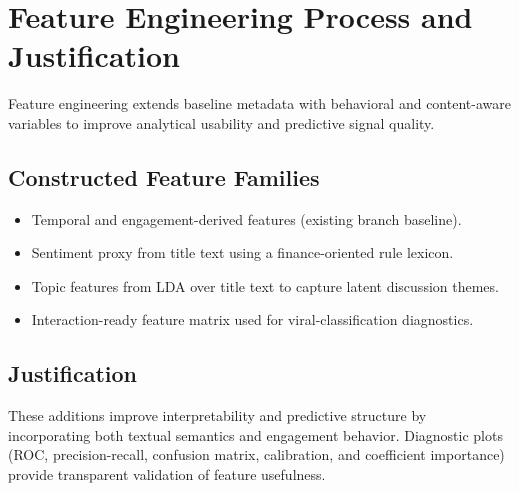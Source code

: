 \section{Feature Engineering Process and Justification}

Feature engineering extends baseline metadata with behavioral and content-aware variables to improve analytical usability and predictive signal quality.

\subsection{Constructed Feature Families}
\begin{itemize}
  \item Temporal and engagement-derived features (existing branch baseline).
  \item Sentiment proxy from title text using a finance-oriented rule lexicon.
  \item Topic features from LDA over title text to capture latent discussion themes.
  \item Interaction-ready feature matrix used for viral-classification diagnostics.
\end{itemize}

\subsection{Justification}
These additions improve interpretability and predictive structure by incorporating both textual semantics and engagement behavior. Diagnostic plots (ROC, precision-recall, confusion matrix, calibration, and coefficient importance) provide transparent validation of feature usefulness.
